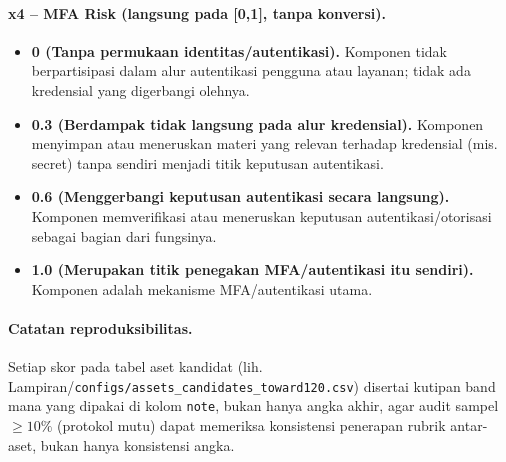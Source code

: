 \paragraph{x4 -- MFA Risk (langsung pada [0,1], tanpa konversi).}

\begin{itemize}
    \item \textbf{0 (Tanpa permukaan identitas/autentikasi).}
    Komponen tidak berpartisipasi dalam alur autentikasi pengguna
    atau layanan; tidak ada kredensial yang digerbangi olehnya.

    \item \textbf{0.3 (Berdampak tidak langsung pada alur
    kredensial).} Komponen menyimpan atau meneruskan materi yang
    relevan terhadap kredensial (mis. secret) tanpa sendiri menjadi
    titik keputusan autentikasi.

    \item \textbf{0.6 (Menggerbangi keputusan autentikasi secara
    langsung).} Komponen memverifikasi atau meneruskan keputusan
    autentikasi/otorisasi sebagai bagian dari fungsinya.

    \item \textbf{1.0 (Merupakan titik penegakan MFA/autentikasi
    itu sendiri).} Komponen adalah mekanisme MFA/autentikasi utama.
\end{itemize}

\paragraph{Catatan reproduksibilitas.} Setiap skor pada tabel aset
kandidat (lih. Lampiran/\texttt{configs/assets\_candidates\_toward120.csv})
disertai kutipan band mana yang dipakai di kolom \texttt{note}, bukan
hanya angka akhir, agar audit sampel ${\ge}10\%$ (protokol mutu)
dapat memeriksa konsistensi penerapan rubrik
antar-aset, bukan hanya konsistensi angka.
